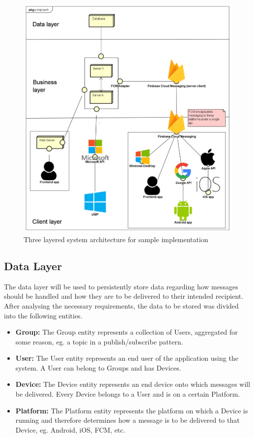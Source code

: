 \begin{figure}[H]
	\centering
	\includegraphics[width=1\textwidth]{figures/03_design/s-impl-arch}
    \caption{Three layered system architecture for sample implementation}
    \label{fig:s-impl-arch}
\end{figure}

\subsection{Data Layer}
The data layer will be used to persistently store data regarding how messages should be handled and how they are to be delivered to their intended recipient. After analysing the necessary requirements, the data to be stored was divided into the following entities.
\begin{itemize}
\item \textbf{Group:} The Group entity represents a collection of Users, aggregated for some reason, eg. a topic in a publish/subscribe pattern.
\item \textbf{User:} The User entity represents an end user of the application using the system. A User can belong to Groups and has Devices.
\item \textbf{Device:} The Device entity represents an end device onto which messages will be delivered. Every Device belongs to a User and is on a certain Platform.
\item \textbf{Platform:} The Platform entity represents the platform on which a Device is running and therefore determines how a message is to be delivered to that Device, eg. Android, iOS, FCM, etc.
\end{itemize}

